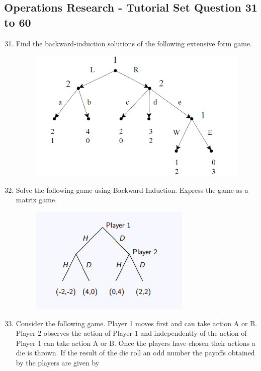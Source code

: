 \documentclass[]{report}
\begin{document}
\subsection*{Operations Research - Tutorial Set Question 31 to 60}
\begin{enumerate}
	\setcounter{enumi}{30}

\item 
Find the backward-induction solutions of the following extensive form game.
\begin{figure}[h!]
	\centering
	\includegraphics[width=0.45\linewidth]{Q31}
	
\end{figure}



\item Solve the following game using Backward Induction. Express the game as a matrix game.

\begin{figure}[h!]
	\centering
	\includegraphics[width=0.4\linewidth]{Q32}
	
\end{figure}


\item Consider the following game. Player 1 moves first and can take action A or B.
Player 2 observes the action of Player 1 and independently of the action of Player 1 can
take action A or B. Once the players have chosen their actions a die is thrown. If the
result of the die roll an odd number the payoffs obtained by the players are given by



\end{enumerate}
\end{document}
